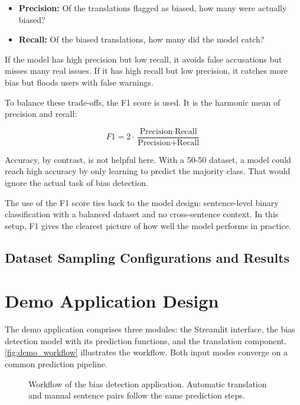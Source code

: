 \begin{itemize}
    \item \textbf{Precision:} Of the translations flagged as biased, how many were actually biased?
    \item \textbf{Recall:} Of the biased translations, how many did the model catch?
\end{itemize}

If the model has high precision but low recall, it avoids false accusations but misses many real issues. If it has high recall but low precision, it catches more bias but floods users with false warnings. 

To balance these trade-offs, the F1 score is used. It is the harmonic mean of precision and recall:


\[
F1 = 2 \cdot \frac{\text{Precision} \cdot \text{Recall}}{\text{Precision} + \text{Recall}}
\]
\vspace{0.5em}

Accuracy, by contrast, is not helpful here. With a 50-50 dataset, a model could reach high accuracy by only learning to predict the majority class. That would ignore the actual task of bias detection.

The use of the F1 score ties back to the model design: sentence-level binary classification with a balanced dataset and no cross-sentence context. In this setup, F1 gives the clearest picture of how well the model performs in practice.

\subsection{Dataset Sampling Configurations and Results} \label{subsection:eval_dataset}

\section{Demo Application Design}

The demo application comprises three modules: the Streamlit interface, the bias detection model with its prediction functions, and the translation component. \autoref{fig:demo_workflow} illustrates the workflow. Both input modes converge on a common prediction pipeline.

\begin{figure}[htb]
    \centering
    \scalebox{0.8}{}
    \caption{Workflow of the bias detection application. Automatic translation and manual sentence pairs follow the same prediction steps.}
    \label{fig:demo_workflow}
\end{figure}


